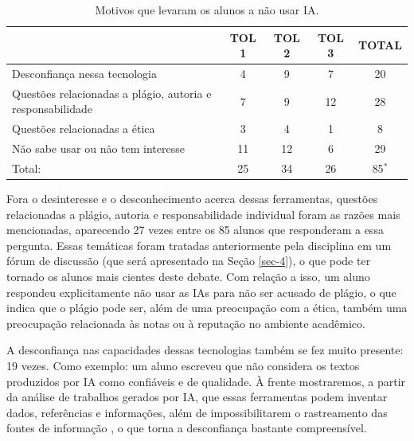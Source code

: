 \documentclass[portuguese]{textolivre}
\begin{document}
\begin{table}[h!]
\centering
\begin{threeparttable}
\caption{Motivos que levaram os alunos a não usar IA.}\label{tab-4}
\begin{tabular}{lcccc}
\toprule
 & TOL 1 & TOL 2 & TOL 3 & TOTAL \\
\midrule
Desconfiança nessa tecnologia & 4 & 9 & 7 & 20 \\
Questões relacionadas a plágio, autoria e responsabilidade & 7 & 9 & 12 & 28 \\
Questões relacionadas a ética & 3 & 4 & 1 & 8 \\
Não sabe usar ou não tem interesse & 11 & 12 & 6 & 29 \\
Total: & 25 & 34 & 26 & 85$^*$ \\
\bottomrule
\end{tabular}
\end{threeparttable}
\end{table} 

Fora o desinteresse e o desconhecimento acerca dessas ferramentas, questões relacionadas a plágio, autoria e responsabilidade individual foram as razões mais mencionadas, aparecendo 27 vezes entre os 85 alunos que responderam a essa pergunta. Essas temáticas foram tratadas anteriormente pela disciplina em um fórum de discussão (que será apresentado na Seção \ref{sec-4}), o que pode ter tornado os alunos mais cientes deste debate. Com relação a isso, um aluno respondeu explicitamente não usar as IAs para não ser acusado de plágio, o que indica que o plágio pode ser, além de uma preocupação com a ética, também uma preocupação relacionada às notas ou à reputação no ambiente acadêmico.

A desconfiança nas capacidades dessas tecnologias também se fez muito presente: 19 vezes. Como exemplo: um aluno escreveu que não considera os textos produzidos por IA como confiáveis e de qualidade. À frente mostraremos, a partir da análise de trabalhos gerados por IA, que essas ferramentas podem inventar dados, referências e informações, além de impossibilitarem o rastreamento das fontes de informação \cite{moraes2013}, o que torna a desconfiança bastante compreensível.
\end{document}
